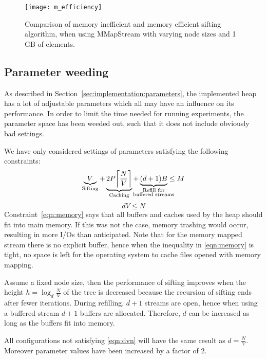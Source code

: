 \begin{figure}
  \centering
  \texttt{[image: m\_efficiency]}
  \caption{Comparison of memory inefficient and memory efficient sifting algorithm, when using MMapStream with varying node sizes and 1 GB of elements.}
  \label{fig:m-efficiency}
\end{figure}

\subsection{Parameter weeding}
As described in Section~\ref{sec:implementation:parameters}, the implemented heap has a lot of adjustable parameters which all may have an influence on its performance. In order to limit the time needed for running experiments, the parameter space has been weeded out, such that it does not include obviously bad settings.

We have only considered settings of parameters satisfying the following constraints:
\begin{equation}
  \label{eqn:memory}
  \underbrace{V}_{\textrm{Sifting}} + \underbrace{2P \ceil*{\frac{N}{V}}}_{\textrm{Caching}} + \underbrace{(d + 1)B}_{\mathclap{\substack{
  \textrm{Refill for}\\\textrm{buffered streams}
  }}} \leq M
\end{equation}
\begin{equation}
  \label{eqn:dvn}
  dV\leq N
\end{equation}
Constraint~\ref{eqn:memory} says that all buffers and caches used by the heap should fit into main memory. If this was not the case, memory trashing would occur, resulting in more I/Os than anticipated. Note that for the memory mapped stream there is no explicit buffer, hence when the inequality in \eqref{eqn:memory} is tight, no space is left for the operating system to cache files opened with memory mapping.

Assume a fixed node size, then the performance of sifting improves when the height $h = \log_d{\frac{N}{V}}$ of the tree is decreased because the recursion of sifting ends after fewer iterations. During refilling, $d+1$ streams are open, hence when using a buffered stream $d+1$ buffers are allocated. Therefore, $d$ can be increased as long as the buffers fit into memory.

All configurations not satisfying \eqref{eqn:dvn} will have the same result as $d=\frac{N}{V}$. Moreover parameter values have been increased by a factor of $2$.

